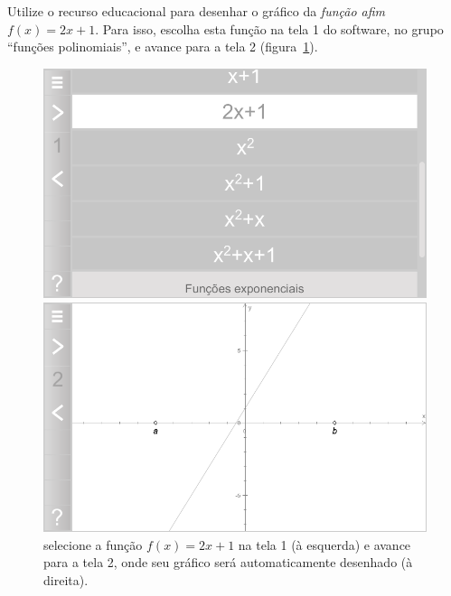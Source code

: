 \documentclass[a4paper,12pt]{scrartcl}
\begin{document}
    \begin{list}{.}{
	\setlength\leftmargin{0cm}%
	\setlength\itemindent\parindent%
	\setlength\listparindent{\parindent}%
        \setlength{}%
        \setlength{}%
    }
  
      \item Utilize o recurso educacional para desenhar o gráfico da \emph{função afim} $f(x) = 2x + 1$. Para isso, escolha esta função na tela 1 do software, no grupo ``funções polinomiais'', e avance para a tela 2 (figura~\ref{fig:f}).
            
      \begin{figure}
	\begin{minipage}[t]{0.49\textwidth}
	  \includegraphics[width=\textwidth]{f.png}	  
	\end{minipage}
	\hfill
	\begin{minipage}[t]{0.49\textwidth}
	  \includegraphics[width=\textwidth]{grafico-f.png}
	\end{minipage}
	\caption{selecione a função $f(x) = 2x + 1$ na tela 1 (à esquerda) e avance para a tela 2, onde seu gráfico será automaticamente desenhado (à direita).}
	\label{fig:f}
      \end{figure}
      

\end{list}
\end{document}
